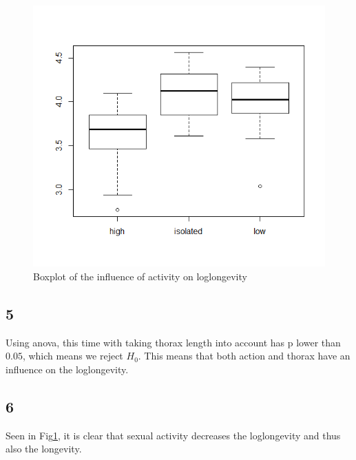 \documentclass{article}
\begin{document}
      \begin{figure}[H]
          \centering
          \includegraphics[scale=0.3]{../results/BoxActivity.png}
          \caption{Boxplot of the influence of activity on loglongevity}
          \label{fig:BoxActivity}
      \end{figure}

    \subsection*{5}
      Using anova, this time with taking thorax length into account has p lower than $0.05$, which means we reject $H_0$.
      This means that both action and thorax have an influence on the loglongevity.

    \subsection*{6}
      Seen in Fig\ref{fig:BoxActivity}, it is clear that sexual activity decreases the loglongevity and thus also the longevity.
\end{document}
